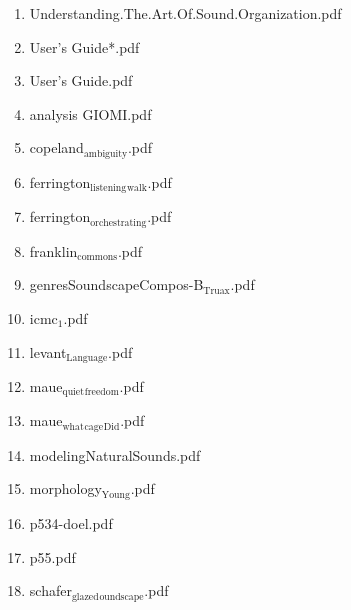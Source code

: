 \documentclass[11pt]{article}
\begin{document}
\begin{enumerate}
\begin{enumerate}
\item Understanding.The.Art.Of.Sound.Organization.pdf
\label{sec-1-1-1-1-11-19-29-1-66}

\item User's Guide*.pdf
\label{sec-1-1-1-1-11-19-29-1-67}

\item User's Guide.pdf
\label{sec-1-1-1-1-11-19-29-1-68}

\item analysis GIOMI.pdf
\label{sec-1-1-1-1-11-19-29-1-69}

\item copeland$_{\text{ambiguity}}$.pdf
\label{sec-1-1-1-1-11-19-29-1-70}

\item ferrington$_{\text{listening}}$$_{\text{walk}}$.pdf
\label{sec-1-1-1-1-11-19-29-1-71}

\item ferrington$_{\text{orchestrating}}$.pdf
\label{sec-1-1-1-1-11-19-29-1-72}

\item franklin$_{\text{commons}}$.pdf
\label{sec-1-1-1-1-11-19-29-1-73}

\item genresSoundscapeCompos-B$_{\text{Truax}}$.pdf
\label{sec-1-1-1-1-11-19-29-1-74}

\item icmc$_{\text{1}}$.pdf
\label{sec-1-1-1-1-11-19-29-1-75}

\item levant$_{\text{Language}}$.pdf
\label{sec-1-1-1-1-11-19-29-1-76}

\item maue$_{\text{quiet}}$$_{\text{freedom}}$.pdf
\label{sec-1-1-1-1-11-19-29-1-77}

\item maue$_{\text{what}}$$_{\text{cage}}$$_{\text{Did}}$.pdf
\label{sec-1-1-1-1-11-19-29-1-78}

\item modelingNaturalSounds.pdf
\label{sec-1-1-1-1-11-19-29-1-79}

\item morphology$_{\text{Young}}$.pdf
\label{sec-1-1-1-1-11-19-29-1-80}

\item p534-doel.pdf
\label{sec-1-1-1-1-11-19-29-1-81}

\item p55.pdf
\label{sec-1-1-1-1-11-19-29-1-82}

\item schafer$_{\text{glazed}}$$_{\text{oundscape}}$.pdf
\label{sec-1-1-1-1-11-19-29-1-83}


\end{enumerate}
\end{enumerate}
\end{document}
